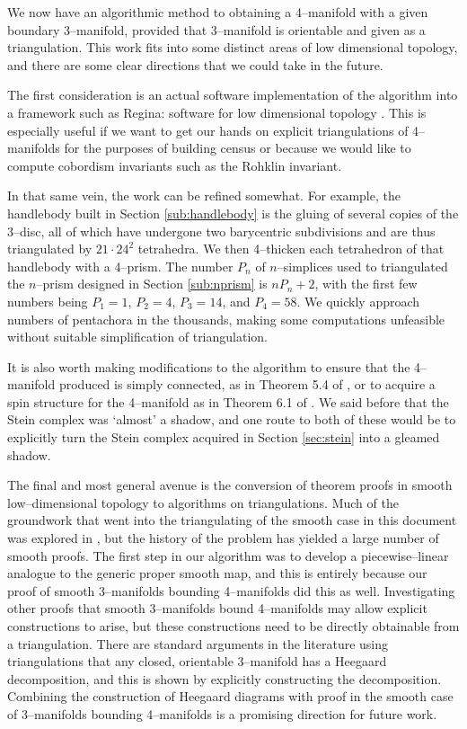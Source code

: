 We now have an algorithmic method to obtaining a 4--manifold with a given boundary 3--manifold, provided that 3--manifold is orientable and given as a triangulation.
This work fits into some distinct areas of low dimensional topology, and there are some clear directions that we could take in the future.

The first consideration is an actual software implementation of the algorithm into a framework such as Regina: software for low dimensional topology \cite{regina}.
This is especially useful if we want to get our hands on explicit triangulations of 4--manifolds for the purposes of building census or because we would like to compute cobordism invariants such as the Rohklin invariant.

In that same vein, the work can be refined somewhat.
For example, the handlebody built in Section \ref{sub:handlebody} is the gluing of several copies of the 3--disc, all of which have undergone two barycentric subdivisions and are thus triangulated by $21\cdot 24^2$ tetrahedra.
We then 4--thicken each tetrahedron of that handlebody with a 4--prism.
The number $P_n$ of $n$--simplices used to triangulated the $n$--prism designed in Section \ref{sub:nprism} is  $nP_n +2$, with the first few numbers being $P_1=1$, $P_2=4$, $P_3=14$, and $P_4=58$.
We quickly approach numbers of pentachora in the thousands, making some computations unfeasible without suitable simplification of triangulation.

It is also worth making modifications to the algorithm to ensure that the 4--manifold produced is simply connected, as in Theorem 5.4 of \cite{CostThur08}, or to acquire a spin structure for the 4--manifold as in Theorem 6.1 of \cite{CostThur08}.
We said before that the Stein complex was `almost' a shadow, and one route to both of these would be to explicitly turn the Stein complex acquired in Section \ref{sec:stein} into a gleamed shadow.

The final and most general avenue is the conversion of theorem proofs in smooth low--dimensional topology to algorithms on triangulations.
Much of the groundwork that went into the triangulating of the smooth case in this document was explored in \cite{CostThur08}, but the history of the problem has yielded a large number of smooth proofs.
The first step in our algorithm was to develop a piecewise--linear analogue to the generic proper smooth map, and this is entirely because our proof of smooth 3--manifolds bounding 4--manifolds did this as well.
Investigating other proofs that smooth 3--manifolds bound 4--manifolds may allow explicit constructions to arise, but these constructions need to be directly obtainable from a triangulation.
There are standard arguments in the literature using triangulations that any closed, orientable 3--manifold has a Heegaard decomposition, and this is shown by explicitly constructing the decomposition.
Combining the construction of Heegaard diagrams with proof in the smooth case of 3--manifolds bounding 4--manifolds is a promising direction for future work.

